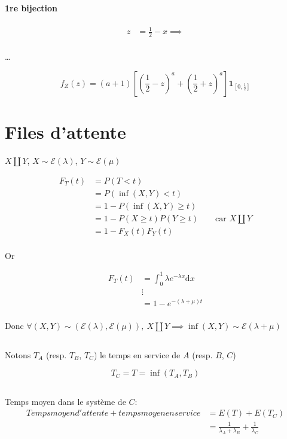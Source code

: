 \documentclass{article}
\newcommand{\dx}{\mathrm{d}x}
\begin{document}
\paragraph{1re bijection}

\begin{align*}
	z &= \frac{1}{2}-x \implies  \\
\end{align*}


\ldots

\[
	f_Z(z) = (a+1) \left[(\frac{1}{2}-z)^a + (\frac{1}{2}+z)^a\right] \mathbf{1}_{[0, \frac{1}{2}]}
\] 

\setcounter{section}{4}
\section{Files d'attente}

$X \coprod Y$,  $X \sim \mathcal{E}(\lambda)$, $Y \sim \mathcal{E}(\mu)$ 

\begin{align*}
	F_T(t) &= P(T<t) \\
	       &= P(\inf(X, Y)<t) \\
	       &= 1-P(\inf(X, Y)\ge t) \\
	       &= 1-P(X\ge t)P(Y\ge t) \qquad\text{car $X \coprod Y$} \\
	       &= 1-F_X(t)F_Y(t) \\
\end{align*}


Or

 \begin{align*}
	F_T(t) &= \int_0^1 \lambda e^{-\lambda x} \dx \\
	       &\vdots \\
	       &= 1- e^{-(\lambda+\mu)t}  \\
\end{align*}

Donc $\forall (X, Y) \sim (\mathcal{E}(\lambda), \mathcal{E}(\mu)),\ X \coprod Y \implies \inf(X, Y) \sim \mathcal{E}(\lambda + \mu)$

\subsection{}
Notons $T_A$ (resp. $T_B$, $T_C$) le temps en service de $A$ (resp. $B$, $C$)

\[
	T_C = T = \inf(T_A, T_B)
\] 

\subsection{}
Temps moyen dans le système de $C$:  
\begin{align*}
	Temps moyen d'attente + temps moyen en service &= E(T) + E(T_C) \\
	&= \frac{1}{\lambda_A + \lambda_B} + \frac{1}{\lambda_C} \\
\end{align*}
\end{document}

